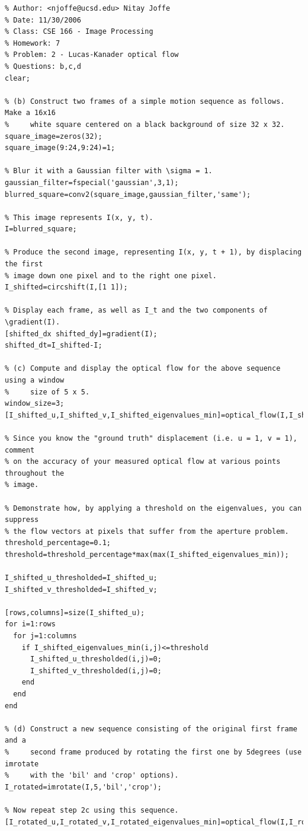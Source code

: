 \documentclass{article}
\begin{document}
\begin{verbatim}
% Author: <njoffe@ucsd.edu> Nitay Joffe
% Date: 11/30/2006
% Class: CSE 166 - Image Processing
% Homework: 7
% Problem: 2 - Lucas-Kanader optical flow
% Questions: b,c,d
clear;

% (b) Construct two frames of a simple motion sequence as follows. Make a 16x16
%     white square centered on a black background of size 32 x 32.
square_image=zeros(32);
square_image(9:24,9:24)=1;

% Blur it with a Gaussian filter with \sigma = 1.
gaussian_filter=fspecial('gaussian',3,1);
blurred_square=conv2(square_image,gaussian_filter,'same');

% This image represents I(x, y, t).
I=blurred_square;

% Produce the second image, representing I(x, y, t + 1), by displacing the first
% image down one pixel and to the right one pixel.
I_shifted=circshift(I,[1 1]);

% Display each frame, as well as I_t and the two components of \gradient(I).
[shifted_dx shifted_dy]=gradient(I);
shifted_dt=I_shifted-I;

% (c) Compute and display the optical flow for the above sequence using a window
%     size of 5 x 5.
window_size=3;
[I_shifted_u,I_shifted_v,I_shifted_eigenvalues_min]=optical_flow(I,I_shifted,window_size);

% Since you know the "ground truth" displacement (i.e. u = 1, v = 1), comment
% on the accuracy of your measured optical flow at various points throughout the
% image.

% Demonstrate how, by applying a threshold on the eigenvalues, you can suppress
% the flow vectors at pixels that suffer from the aperture problem.
threshold_percentage=0.1;
threshold=threshold_percentage*max(max(I_shifted_eigenvalues_min));

I_shifted_u_thresholded=I_shifted_u;
I_shifted_v_thresholded=I_shifted_v;

[rows,columns]=size(I_shifted_u);
for i=1:rows
  for j=1:columns
    if I_shifted_eigenvalues_min(i,j)<=threshold
      I_shifted_u_thresholded(i,j)=0;
      I_shifted_v_thresholded(i,j)=0;
    end
  end
end

% (d) Construct a new sequence consisting of the original first frame and a
%     second frame produced by rotating the first one by 5degrees (use imrotate
%     with the 'bil' and 'crop' options).
I_rotated=imrotate(I,5,'bil','crop');

% Now repeat step 2c using this sequence.
[I_rotated_u,I_rotated_v,I_rotated_eigenvalues_min]=optical_flow(I,I_rotated,window_size);


\end{verbatim}
\end{document}
